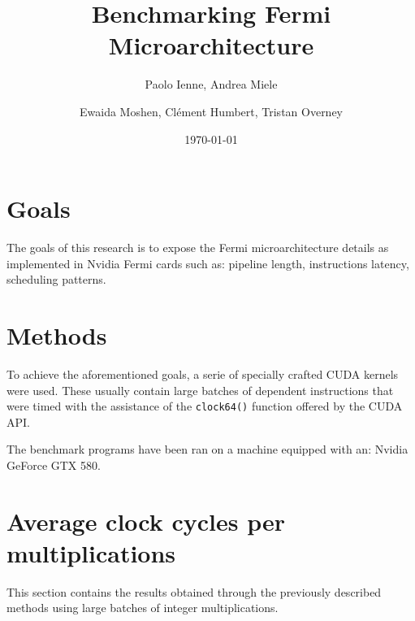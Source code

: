 \documentclass{article}
\begin{document}
\title{Benchmarking Fermi Microarchitecture}
\author{Paolo Ienne, Andrea Miele\and Ewaida Moshen, Cl\'{e}ment Humbert, Tristan Overney}
\date{\today}
\maketitle

\section{Goals}
	The goals of this research is to expose the Fermi microarchitecture details as implemented 
    in Nvidia Fermi cards such as: pipeline length, instructions latency, scheduling patterns.

\section{Methods}
	To achieve the aforementioned goals, a serie of specially crafted CUDA kernels
	were used. These usually contain large batches of dependent instructions that were 
	timed with the assistance of the \texttt{clock64()} function offered by the CUDA API.

	The benchmark programs have been ran on a machine equipped with an: 
	Nvidia GeForce GTX 580.
	\pagebreak

\section{Average clock cycles per multiplications}
	This section contains the results obtained through the previously described
	methods using large batches of integer multiplications.
\end{document}
